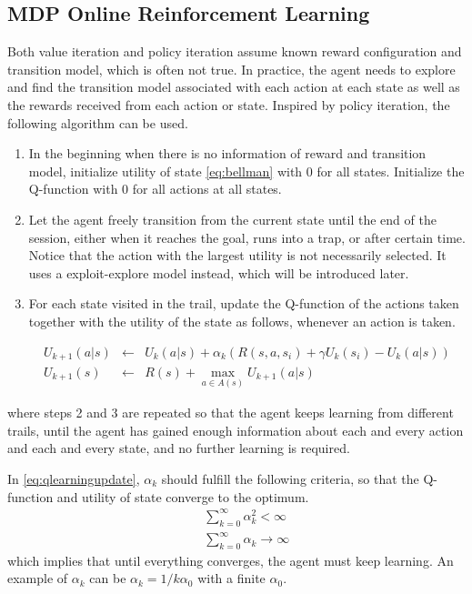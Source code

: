\subsection{MDP Online Reinforcement Learning}

Both value iteration and policy iteration assume known reward configuration and transition model, which is often not true. In practice, the agent needs to explore and find the transition model associated with each action at each state as well as the rewards received from each action or state. Inspired by policy iteration, the following  algorithm can be used.

\begin{enumerate}
	\item In the beginning when there is no information of reward and transition model, initialize utility of state \eqref{eq:bellman} with $0$ for all states. Initialize the Q-function with $0$ for all actions at all states.
	\item Let the agent freely transition from the current state until the end of the session, either when it reaches the goal, runs into a trap, or after certain time. Notice that the action with the largest utility is not necessarily selected. It uses a exploit-explore model instead, which will be introduced later.
	\item For each state visited in the trail, update the Q-function of the actions taken together with the utility of the state as follows, whenever an action is taken.

	\begin{eqnarray}
		U_{k+1}(a|s) &\leftarrow& U_k(a|s) + \alpha_k\left(R(s,a,s_i) + \gamma U_k(s_i) - U_k(a|s)\right) \label{eq:qlearningupdate} \\
		U_{k+1}(s) &\leftarrow& R(s) + \max_{a\in A(s)} U_{k+1}(a|s) \nonumber
	\end{eqnarray}

\end{enumerate}
where steps 2 and 3 are repeated so that the agent keeps learning from different trails, until the agent has gained enough information about each and every action and each and every state, and no further learning is required.

In \eqref{eq:qlearningupdate}, $\alpha_k$ should fulfill the following criteria, so that the Q-function and utility of state converge to the optimum.
\begin{eqnarray}
	&& \sum_{k=0}^{\infty} \alpha_k^2 < \infty \nonumber \\
	&& \sum_{k=0}^{\infty} \alpha_k \rightarrow \infty \nonumber
\end{eqnarray}
which implies that until everything converges, the agent must keep learning. An example of $\alpha_k$ can be $\alpha_k = 1/k \alpha_0$ with a finite $\alpha_0$.

